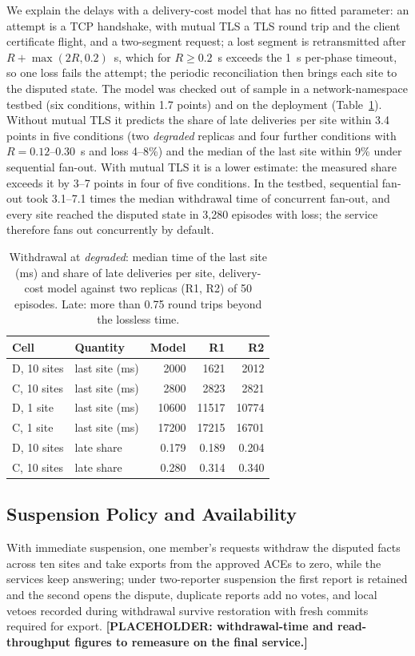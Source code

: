We explain the delays with a delivery-cost model that has no fitted parameter: an attempt is a TCP handshake, with mutual TLS a TLS round trip and the client certificate flight, and a two-segment request; a lost segment is retransmitted after $R+\max(2R,0.2)$~s, which for $R\ge0.2$~s exceeds the 1~s per-phase timeout, so one loss fails the attempt; the periodic reconciliation then brings each site to the disputed state. The model was checked out of sample in a network-namespace testbed (six conditions, within 1.7 points) and on the deployment (Table~\ref{tab:netem}). Without mutual TLS it predicts the share of late deliveries per site within 3.4 points in five conditions (two \emph{degraded} replicas and four further conditions with $R=0.12$--0.30~s and loss 4--8\%) and the median of the last site within 9\% under sequential fan-out. With mutual TLS it is a lower estimate: the measured share exceeds it by 3--7 points in four of five conditions. In the testbed, sequential fan-out took 3.1--7.1 times the median withdrawal time of concurrent fan-out, and every site reached the disputed state in 3,280 episodes with loss; the service therefore fans out concurrently by default.

\begin{table}[t]
\centering
\caption{Withdrawal at \emph{degraded}: median time of the last site (ms) and share of late deliveries per site, delivery-cost model against two replicas (R1, R2) of 50 episodes. Late: more than 0.75 round trips beyond the lossless time.}
\label{tab:netem}
\scriptsize
\begin{tabular}{@{}llrrr@{}}
\toprule
Cell & Quantity & Model & R1 & R2 \\
\midrule
D, 10 sites & last site (ms) & 2000 & 1621 & 2012 \\
C, 10 sites & last site (ms) & 2800 & 2823 & 2821 \\
D, 1 site & last site (ms) & 10600 & 11517 & 10774 \\
C, 1 site & last site (ms) & 17200 & 17215 & 16701 \\
D, 10 sites & late share & 0.179 & 0.189 & 0.204 \\
C, 10 sites & late share & 0.280 & 0.314 & 0.340 \\
\bottomrule
\end{tabular}
\end{table}

\subsection{Suspension Policy and Availability}
\label{sec:suspension-policy}
With immediate suspension, one member's requests withdraw the disputed facts across ten sites and take exports from the approved ACEs to zero, while the services keep answering; under two-reporter suspension the first report is retained and the second opens the dispute, duplicate reports add no votes, and local vetoes recorded during withdrawal survive restoration with fresh commits required for export. \textbf{[PLACEHOLDER: withdrawal-time and read-throughput figures to remeasure on the final service.]}

